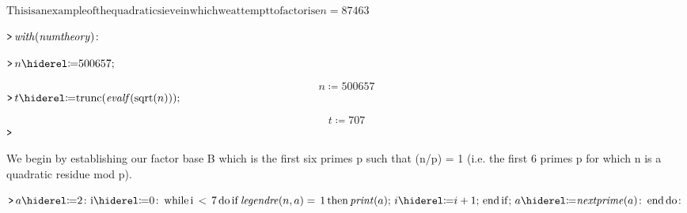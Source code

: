 \documentclass{article}
\begin{document}
\lstset{basicstyle=\ttfamily,breaklines=true,columns=flexible}
\pagestyle{empty}
\begin{Maple Normal}

\end{Maple Normal}
\begin{Maple Normal}
{$ \displaystyle \mathrm{This}\mathrm{is}\mathrm{an}\mathrm{example}\mathrm{of}\mathrm{the}\mathrm{quadratic}\mathrm{sieve}\mathrm{in}\mathrm{which}\mathrm{we}\mathrm{attempt}\mathrm{to}\mathrm{factorise}n =87463 $}
\end{Maple Normal}
\mapleinput
{$ \displaystyle \texttt{>\,} \mathit{with} (\mathit{numtheory})\colon  $}

\mapleinput
{$ \displaystyle \texttt{>\,} n \coloneqq 500657; $}

\begin{dmath}\label{(1)}
n \coloneqq 500657
\end{dmath}
\mapleinput
{$ \displaystyle \texttt{>\,} t \coloneqq \mathrm{trunc}(\mathit{evalf} (\mathrm{sqrt}(n))); $}

\begin{dmath}\label{(2)}
t \coloneqq 707
\end{dmath}
\mapleinput
{$ \displaystyle \texttt{>\,}  $}

\begin{Maple Normal}
We begin by establishing our factor base B which is the first six primes p such that (n/p) = 1 (i.e. the first 6 primes p for which n is a quadratic residue mod p).
\end{Maple Normal}
\mapleinput
{$ \displaystyle \texttt{>\,} a \coloneqq 2\colon \mathrm{i}\coloneqq 0\colon \,\mathrm{while}\,\mathrm{i}\,<\,7\,\mathrm{do}\,\mathrm{if}\,\mathit{legendre} (n ,a)=\,1\,\mathrm{then}\,\mathit{print} (a);\,i \coloneqq i +1;\,\mathrm{end}\,\mathrm{if};\,a \coloneqq \mathit{nextprime} (a)\colon \,\mathrm{end}\,\mathrm{do}\colon  $}
\end{document}
